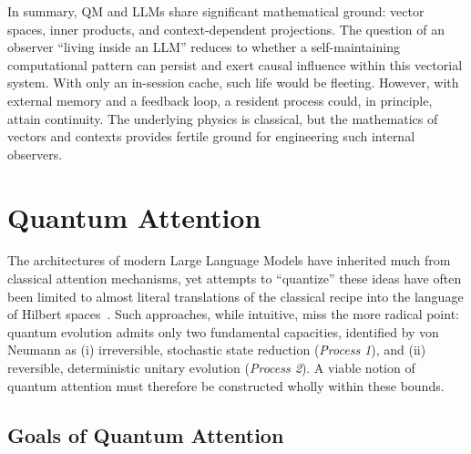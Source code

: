\documentclass[%
  reprint,
  superscriptaddress,
  showpacs,
  showkeys,
  amsmath,amssymb,
  pra,
  longbibliography,
  floatfix,
  x11names
]{revtex4-2}
\begin{document}
In summary, QM and LLMs share significant mathematical ground: vector spaces, inner products, and context-dependent projections. The question of an observer ``living inside an LLM'' reduces to whether a self-maintaining computational pattern can persist and exert causal influence within this vectorial system. With only an in-session cache, such life would be fleeting. However, with external memory and a feedback loop, a resident process could, in principle, attain continuity. The underlying physics is classical, but the mathematics of vectors and contexts provides fertile ground for engineering such internal observers.


\section{Quantum Attention}
\label{section:quantum_attention}

The architectures of modern Large Language Models have inherited much from
classical attention mechanisms, yet attempts to ``quantize'' these ideas
have often been limited to almost literal translations of the classical recipe
into the language of Hilbert spaces~\cite{zhang2025surveyquantumtransformersarchitectures}. Such approaches, while intuitive,
miss the more radical point: quantum evolution admits only two fundamental
capacities, identified by von Neumann as
(i) irreversible, stochastic state reduction (\emph{Process 1}),
and (ii) reversible, deterministic unitary evolution (\emph{Process 2}).
A viable notion of quantum attention must therefore be constructed wholly within
these bounds.

\subsection{Goals of Quantum Attention}
\end{document}
